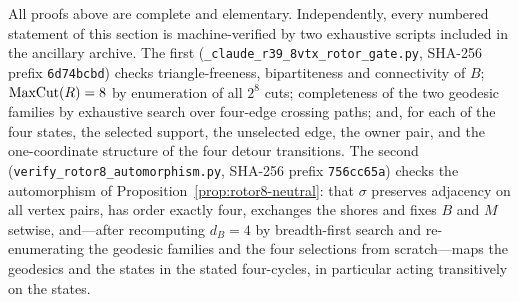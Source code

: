 \begin{remark}[Verification]\label{rem:rotor8-verification}
All proofs above are complete and elementary. Independently, every
numbered statement of this section is machine-verified by two
exhaustive scripts included in the ancillary archive. The first
(\texttt{\_claude\_r39\_8vtx\_rotor\_gate.py}, SHA-256 prefix
\texttt{6d74bcbd}) checks triangle-freeness, bipartiteness and
connectivity of \(B\); \(\operatorname{MaxCut}(R)=8\) by enumeration of all \(2^8\)
cuts; completeness of the two geodesic families by exhaustive search
over four-edge crossing paths; and, for each of the four states, the
selected support, the unselected edge, the owner pair, and the
one-coordinate structure of the four detour transitions. The second
(\texttt{verify\_rotor8\_automorphism.py}, SHA-256 prefix
\texttt{756cc65a}) checks the automorphism of
Proposition~\ref{prop:rotor8-neutral}: that \(\sigma\) preserves
adjacency on all vertex pairs, has order exactly four, exchanges the
shores and fixes \(B\) and \(M\) setwise, and---after recomputing
\(d_B=4\) by breadth-first search and re-enumerating the geodesic
families and the four selections from scratch---maps the geodesics and
the states in the stated four-cycles, in particular acting
transitively on the states.
\end{remark}
